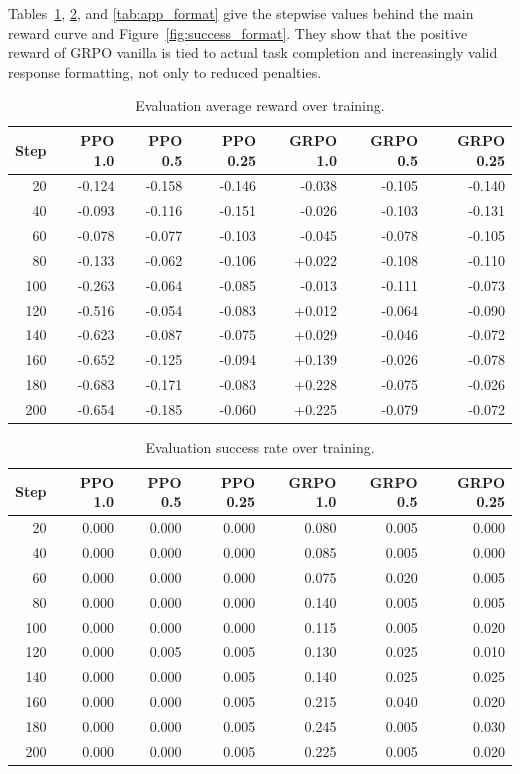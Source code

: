 Tables~\ref{tab:app_reward}, \ref{tab:app_success}, and \ref{tab:app_format} give the stepwise values behind the main reward curve and Figure~\ref{fig:success_format}. They show that the positive reward of GRPO vanilla is tied to actual task completion and increasingly valid response formatting, not only to reduced penalties.

\begin{table}[!htbp]
\centering
\small
\begin{tabular}{rrrrrrr}
\toprule
Step & PPO 1.0 & PPO 0.5 & PPO 0.25 & GRPO 1.0 & GRPO 0.5 & GRPO 0.25 \\
\midrule
20  & -0.124 & -0.158 & -0.146 & -0.038 & -0.105 & -0.140 \\
40  & -0.093 & -0.116 & -0.151 & -0.026 & -0.103 & -0.131 \\
60  & -0.078 & -0.077 & -0.103 & -0.045 & -0.078 & -0.105 \\
80  & -0.133 & -0.062 & -0.106 & +0.022 & -0.108 & -0.110 \\
100 & -0.263 & -0.064 & -0.085 & -0.013 & -0.111 & -0.073 \\
120 & -0.516 & -0.054 & -0.083 & +0.012 & -0.064 & -0.090 \\
140 & -0.623 & -0.087 & -0.075 & +0.029 & -0.046 & -0.072 \\
160 & -0.652 & -0.125 & -0.094 & +0.139 & -0.026 & -0.078 \\
180 & -0.683 & -0.171 & -0.083 & +0.228 & -0.075 & -0.026 \\
200 & -0.654 & -0.185 & -0.060 & +0.225 & -0.079 & -0.072 \\
\bottomrule
\end{tabular}
\caption{Evaluation average reward over training.}
\label{tab:app_reward}
\end{table}

\begin{table}[!htbp]
\centering
\small
\begin{tabular}{rrrrrrr}
\toprule
Step & PPO 1.0 & PPO 0.5 & PPO 0.25 & GRPO 1.0 & GRPO 0.5 & GRPO 0.25 \\
\midrule
20  & 0.000 & 0.000 & 0.000 & 0.080 & 0.005 & 0.000 \\
40  & 0.000 & 0.000 & 0.000 & 0.085 & 0.005 & 0.000 \\
60  & 0.000 & 0.000 & 0.000 & 0.075 & 0.020 & 0.005 \\
80  & 0.000 & 0.000 & 0.000 & 0.140 & 0.005 & 0.005 \\
100 & 0.000 & 0.000 & 0.000 & 0.115 & 0.005 & 0.020 \\
120 & 0.000 & 0.005 & 0.005 & 0.130 & 0.025 & 0.010 \\
140 & 0.000 & 0.000 & 0.005 & 0.140 & 0.025 & 0.025 \\
160 & 0.000 & 0.000 & 0.005 & 0.215 & 0.040 & 0.020 \\
180 & 0.000 & 0.000 & 0.005 & 0.245 & 0.005 & 0.030 \\
200 & 0.000 & 0.000 & 0.005 & 0.225 & 0.005 & 0.020 \\
\bottomrule
\end{tabular}
\caption{Evaluation success rate over training.}
\label{tab:app_success}
\end{table}

